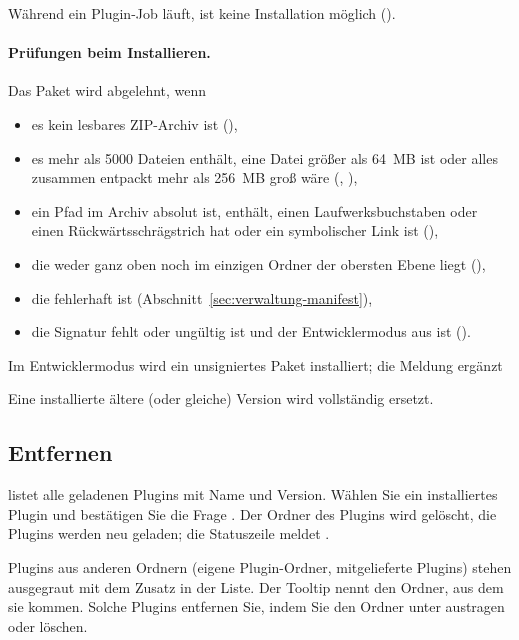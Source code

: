 Während ein Plugin-Job läuft, ist keine Installation möglich ().

\paragraph{Prüfungen beim Installieren.} Das Paket wird abgelehnt, wenn

\begin{itemize}
  \item es kein lesbares ZIP-Archiv ist (),
  \item es mehr als 5000 Dateien enthält, eine Datei größer als 64~MB ist oder alles zusammen
        entpackt mehr als 256~MB groß wäre (,
        ),
  \item ein Pfad im Archiv absolut ist,  enthält, einen Laufwerksbuchstaben oder einen
        Rückwärtsschrägstrich hat oder ein symbolischer Link ist
        (),
  \item die  weder ganz oben noch im einzigen Ordner der obersten Ebene liegt
        (),
  \item die  fehlerhaft ist (Abschnitt~\ref{sec:verwaltung-manifest}),
  \item die Signatur fehlt oder ungültig ist und der Entwicklermodus aus ist
        ().
\end{itemize}

Im Entwicklermodus wird ein unsigniertes Paket installiert; die Meldung ergänzt

Eine installierte ältere (oder gleiche) Version wird vollständig ersetzt.

\subsection{Entfernen}

 listet alle geladenen Plugins mit Name und Version. Wählen Sie ein
installiertes Plugin und bestätigen Sie die Frage . Der Ordner des
Plugins wird gelöscht, die Plugins werden neu geladen; die Statuszeile meldet
.

Plugins aus anderen Ordnern (eigene Plugin-Ordner, mitgelieferte Plugins) stehen ausgegraut mit
dem Zusatz  in der Liste. Der Tooltip nennt den Ordner, aus dem sie
kommen. Solche Plugins entfernen Sie, indem Sie den Ordner unter 
austragen oder löschen.

